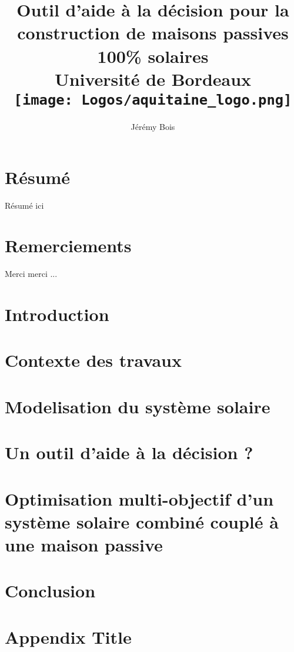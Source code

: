 \documentclass[12pt, oneside]{report}
\title{
    {Outil d’aide à la décision pour la construction de maisons passives 100\% solaires}\\
    {\large Université de Bordeaux}\\
    {\texttt{[image: Logos/aquitaine\_logo.png]}}
}
\author{Jérémy Bois}
\date{}
\theoremstyle{Def}
\begin{document}
\begin{titlepage}
    \maketitle
    \thispagestyle{empty}
\end{titlepage}


\chapter*{Résumé}
Résumé ici

\chapter*{Remerciements}
Merci merci ...


\tableofcontents
\listoffigures
\listoftables
\listofalgorithms
\thispagestyle{empty}
\newpage

% 


\newpage
\listoftodos[Notes]
\newpage

\chapter*{Introduction}


\chapter{Contexte des travaux}


\chapter{Modelisation du système solaire}


\chapter{Un outil d’aide à la décision ?}


\chapter{Optimisation multi-objectif d’un système solaire combiné couplé à une maison passive}


\chapter*{Conclusion}



\appendix
\chapter{Appendix Title}



\printbibliography
\end{document}
